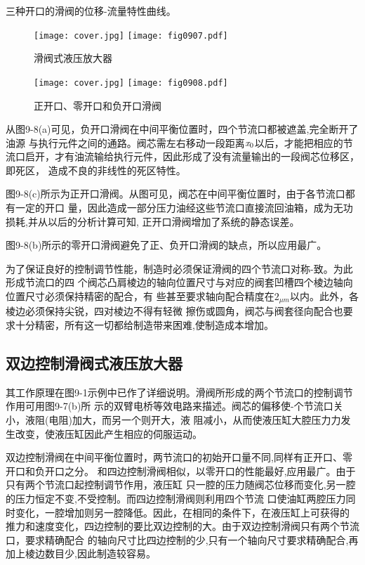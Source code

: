 

\noindent 三种开口的滑阀的位移-流量特性曲线。
\begin{figure}
   \ifOpenSource
   \texttt{[image: cover.jpg]}
   \else
   \texttt{[image: fig0907.pdf]}
   \fi
   \caption{滑阀式液压放大器}
   \label{fig:fig0907}
\end{figure}
\begin{figure}
   \ifOpenSource
   \texttt{[image: cover.jpg]}
   \else
   \texttt{[image: fig0908.pdf]}
   \fi
   \caption{正开口、零开口和负开口滑阀}
   \label{fig:fig0908}
\end{figure}


从图9-8(a)可见，负开口滑阀在中间平衡位置时，四个节流口都被遮盖,完全断开了油源
与执行元件之间的通路。阀芯需左右移动一段距离$\emph{x}_0$以后，才能把相应的节
流口启开，才有油流输给执行元件，因此形成了没有流量输出的一段阀芯位移区，即死区，
造成不良的非线性的死区特性。

图9-8(c)所示为正开口滑阀。从图可见，阀芯在中间平衡位置时，由于各节流口都有一定的开口
量，因此造成一部分压力油经这些节流口直接流回油箱，成为无功损耗,并从以后的分析计算可知,
正开口滑阀增加了系统的静态误差。

图9-8(b)所示的零开口滑阀避免了正、负开口滑阀的缺点，所以应用最广。

为了保证良好的控制调节性能，制造时必须保证滑阀的四个节流口对称-致。为此形成节流口的四
个阀芯凸肩棱边的轴向位置尺寸与对应的阀套凹槽四个棱边轴向位置尺寸必须保持精密的配合，有
些甚至要求轴向配合精度在$2_{\mu m}$以内。此外，各棱边必须保持尖锐，四对棱边不得有轻微
擦伤或圆角，阀芯与阀套径向配合也要求十分精密，所有这一切都给制造带来困难,使制造成本增加。


\subsection{双边控制滑阀式液压放大器}
 
其工作原理在图9-1示例中已作了详细说明。滑阀所形成的两个节流口的控制调节作用可用图9-7(b)所
示的双臂电桥等效电路来描述。阀芯的偏移使-个节流口关小，液阻(电阻)加大，而另一个则开大，液
阻减小，从而使液压缸大腔压力力发生改变，使液压缸因此产生相应的伺服运动。

双边控制滑阀在中间平衡位置时，两节流口的初始开口量不同,同样有正开口、零开口和负开口之分。
和四边控制滑阀相似，以零开口的性能最好,应用最广。由于只有两个节流口起控制调节作用，液压缸
只一腔的压力随阀芯位移而变化,另一腔的压力恒定不变,不受控制。而四边控制滑阀则利用四个节流
口使油缸两腔压力同时变化，一腔增加则另一腔降低。因此，在相同的条件下，在液压缸上可获得的
推力和速度变化，四边控制的要比双边控制的大。由于双边控制滑阀只有两个节流口，要求精确配合
的轴向尺寸比四边控制的少,只有一个轴向尺寸要求精确配合,再加上棱边数目少,因此制造较容易。

